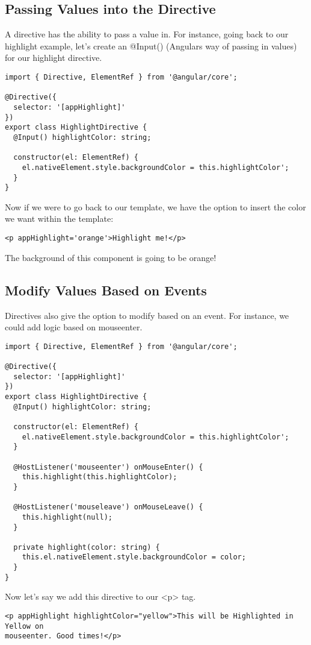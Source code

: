 \subsection{ Passing Values into the Directive }
A directive has the ability to pass a value in. For instance, going back to our
highlight example, let's create an @Input() (Angulars way of passing in values)
for our highlight directive.
\begin{lstlisting}
import { Directive, ElementRef } from '@angular/core';

@Directive({
  selector: '[appHighlight]'
})
export class HighlightDirective {
  @Input() highlightColor: string;

  constructor(el: ElementRef) {
    el.nativeElement.style.backgroundColor = this.highlightColor';
  }
}
\end{lstlisting}

Now if we were to go back to our template, we have the option to insert the
color we want within the template:
\begin{lstlisting}
<p appHighlight='orange'>Highlight me!</p>
\end{lstlisting}

The background of this component is going to be orange!

\subsection{ Modify Values Based on Events }
Directives also give the option to modify based on an event. For instance,
we could add logic based on mouseenter.

\begin{lstlisting}
import { Directive, ElementRef } from '@angular/core';

@Directive({
  selector: '[appHighlight]'
})
export class HighlightDirective {
  @Input() highlightColor: string;

  constructor(el: ElementRef) {
    el.nativeElement.style.backgroundColor = this.highlightColor';
  }

  @HostListener('mouseenter') onMouseEnter() {
    this.highlight(this.highlightColor);
  }

  @HostListener('mouseleave') onMouseLeave() {
    this.highlight(null);
  }

  private highlight(color: string) {
    this.el.nativeElement.style.backgroundColor = color;
  }
}
\end{lstlisting}

Now let's say we add this directive to our <p> tag.

\begin{lstlisting}
<p appHighlight highlightColor="yellow">This will be Highlighted in Yellow on
mouseenter. Good times!</p>
\end{lstlisting}
